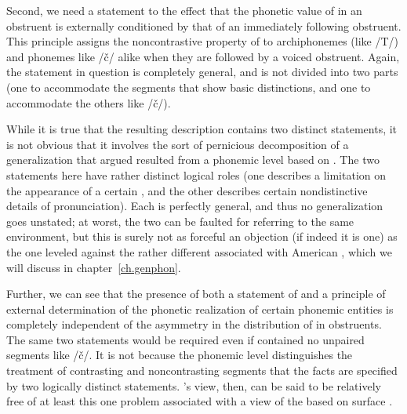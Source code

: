 Second, we need a statement to the effect that the phonetic value of
 in an obstruent is externally conditioned by that of an
immediately following obstruent. This principle assigns the
noncontrastive property of  to archiphonemes (like /T/) and
phonemes like /č/ alike when they are followed by a voiced
obstruent. Again, the statement in question is completely general, and
is not divided into two parts (one to accommodate the segments that
show basic  distinctions, and one to accommodate the others
like /č/).

While it is true that the resulting description contains two distinct
statements, it is not obvious that it involves the sort of pernicious
decomposition of a generalization that {\Halle} argued resulted from a
phonemic level based on . The two statements here have rather
distinct logical roles (one describes a limitation on the appearance
of a certain , and the other describes certain nondistinctive
details of pronunciation). Each is perfectly general, and thus no
generalization goes unstated; at worst, the two can be faulted for
referring to the same environment, but this is surely not as forceful
an objection (if indeed it is one) as the one {\Halle} leveled against
the rather different  associated with American
, which we will discuss in chapter~\ref{ch.genphon}.

Further, we can see that the presence of both a statement of
 and a principle of external determination of the
phonetic realization of certain phonemic entities is completely
independent of the asymmetry in the distribution of  in 
obstruents. The same two statements would be required even if 
contained no unpaired segments like /č/. It is not because the
phonemic level distinguishes the treatment of contrasting and
noncontrasting segments that the   facts are
specified by two logically distinct statements. {\Trubetzkoy}'s view,
then, can be said to be relatively free of at least this one problem
associated with a view of the  based on surface .

